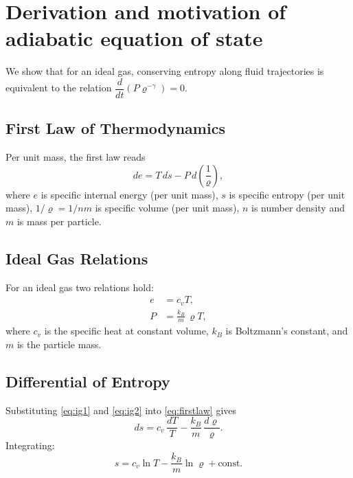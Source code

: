\section{Derivation and motivation of adiabatic equation of state}
\label{sec: App. Adiabatic Equation of State}
 

We show that for an ideal gas, conserving entropy along fluid trajectories is
equivalent to the relation $\dfrac{d}{dt}(P \varrho^{-\gamma})=0$.
 
\subsection*{First Law of Thermodynamics}
 
Per unit mass, the first law reads
\begin{equation}
    de = T\,ds - P\,d\!\left(\frac{1}{ \varrho}\right),
    \label{eq:firstlaw}
\end{equation}
where $e$ is specific internal energy (per unit mass), $s$ is specific entropy (per unit mass), $1/ \varrho = 1/ n m$
is specific volume (per unit mass), $n$ is number density and $m$ is mass per particle.
 
\subsection*{Ideal Gas Relations}
 
For an ideal gas two relations hold:
\begin{align}
    e &= c_v T, \label{eq:ig1}\\
    P &= \frac{k_B}{m}\, \varrho T, \label{eq:ig2}
\end{align}
where $c_v$ is the specific heat at constant volume, $k_B$ is Boltzmann's
constant, and $m$ is the particle mass.
 
\subsection*{Differential of Entropy}
 
Substituting \eqref{eq:ig1} and \eqref{eq:ig2} into \eqref{eq:firstlaw} gives
\begin{equation}
    ds = c_v\,\frac{dT}{T} - \frac{k_B}{m}\,\frac{d \varrho}{ \varrho}.
    \label{eq:ds}
\end{equation}
Integrating:
\begin{equation}
    s = c_v \ln T - \frac{k_B}{m}\ln \varrho + \text{const}.
    \label{eq:s_T}
\end{equation}
 
